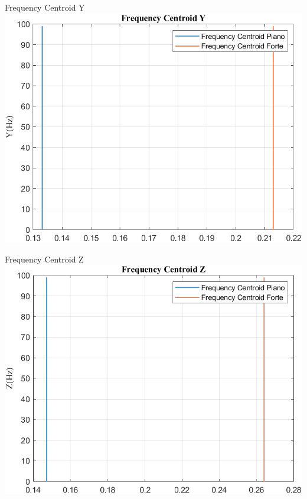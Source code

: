 	\begin{frame}{{Frequency Centroid Y}}
		\centering\includegraphics[height=.8\textheight]{figure/Mag/Trasformata/Frequency CentroidY}
	\end{frame}
	
	\begin{frame}{{Frequency Centroid Z}}
		\centering\includegraphics[height=.8\textheight]{figure/Mag/Trasformata/Frequency CentroidZ}
	\end{frame}
	
